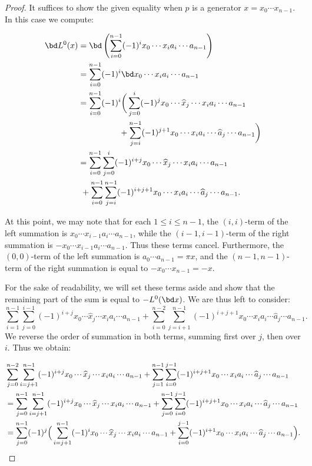 \begin{proof}
It suffices to show the given equality when $p$ is a generator $x = x_0 \cdots x_{n-1}$. In this case we compute:

\begin{align*}
    \bd L^0(x)  &= \bd\left( \sum_{i = 0}^{n-1} (-1)^i x_0 \cdots x_i a_i \cdots a_{n-1}\right) \\ 
     &= \sum_{i = 0}^{n-1} (-1)^i \bd x_0 \cdots x_i a_i \cdots a_{n-1} \\  
     &= \sum_{i=0}^{n-1} (-1)^{i} \bigg(\sum_{j = 0}^{i} (-1)^{j} x_0 \cdots \widehat{x}_j \cdots x_i a_i \cdots a_{n-1} \\ 
     &\qquad \qquad \quad + \sum_{j = i}^{n-1} (-1)^{j+1} x_0 \cdots x_i a_i \cdots \widehat{a}_{j} \cdots a_{n-1}\bigg) \\
     &=  \sum_{i = 0}^{n-1} \sum_{j = 0}^{i} (-1)^{i+j} x_0 \cdots \widehat{x}_j \cdots x_i a_i \cdots a_{n-1} \\
    &  \ + \sum_{i = 0}^{n-1} \sum_{j = i}^{n-1} (-1)^{i+j+1} x_0 \cdots x_i a_i \cdots \widehat{a}_{j} \cdots a_{n-1}.
\end{align*}

At this point, we may note that for each $1 \leq i \leq n - 1$, the $(i, i)$-term of the left summation is $x_0 \cdots x_{i-1} a_i \cdots a_{n-1}$, while the $(i-1,i-1)$-term of the right summation is $-x_0 \cdots x_{i-1} a_i \cdots a_{n-1}$. Thus these terms cancel. Furthermore, the $(0,0)$-term of the left summation is $a_0 \cdots a_{n-1}=\pi x$,  and the  $(n-1,n-1)$-term of the right summation is equal to $-x_0 \cdots x_{n-1} = -x$.

For the sake of readability, we will set these terms aside and show that the remaining part of the sum is equal to $-L^0(\bd x)$. We are thus left to consider:
\[
\sum_{i = 1}^{n-1} \sum_{j = 0}^{i-1}(-1)^{i+j} x_0 \cdots \widehat{x}_j \cdots x_i a_i \cdots a_{n-1} + \sum_{i = 0}^{n-2} \sum_{j = i+1}^{n-1} (-1)^{i+j+1} x_0 \cdots x_i a_i \cdots \widehat{a}_{j} \cdots a_{n-1}.
\]
We reverse the order of summation in both terms, summing first over $j$, then over $i$. Thus we obtain:


\newcommand{\cdotsThin}{\mathinner{\cdotp\mkern-1.75mu\cdotp\mkern-1.75mu\cdotp}}
\begin{align*}
& \sum_{j = 0}^{n-2} \sum_{i=j+1}^{n-1} (-1)^{i+j} x_0 \cdotsThin \widehat{x}_j \cdotsThin x_i a_i \cdotsThin a_{n-1} + \sum_{j = 1}^{n-1} \sum_{i = 0}^{j-1} (-1)^{i+j+1} x_0 \cdotsThin x_i a_i \cdotsThin \widehat{a}_{j} \cdotsThin a_{n-1} \\
&= \sum_{j = 0}^{n-1} \sum_{i=j+1}^{n-1} (-1)^{i+j} x_0 \cdotsThin \widehat{x}_j \cdotsThin x_i a_i \cdotsThin a_{n-1} + \sum_{j = 0}^{n-1} \sum_{i = 0}^{j-1} (-1)^{i+j+1} x_0 \cdotsThin x_i a_i \cdotsThin \widehat{a}_{j} \cdotsThin a_{n-1} \\
&= \sum_{j = 0}^{n-1} (-1)^j \Big(\sum_{i=j+1}^{n-1} (-1)^{i} x_0 \cdotsThin \widehat{x}_j \cdotsThin x_i a_i \cdotsThin a_{n-1} + \sum_{i = 0}^{j-1} (-1)^{i+1} x_0 \cdotsThin x_i a_i \cdotsThin \widehat{a}_{j} \cdotsThin a_{n-1}\Big).
\end{align*}


\end{proof}
